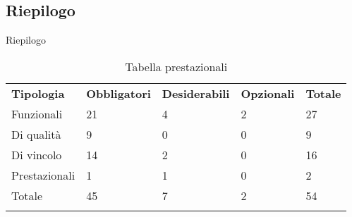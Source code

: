 
	
\subsection{Riepilogo}
Riepilogo
\begin{center}
	\renewcommand{\arraystretch}{1.5}
	\begin{longtable}{  p{1.8cm}  p{2cm} p{2.2cm}  p{1.8cm} p{1.2cm}}
		\rowcolor{tableHeadYellow}
		\textbf{Tipologia}   & \textbf{Obbligatori} & \textbf{Desiderabili} & \textbf{Opzionali} & \textbf{Totale}\\ 
		Funzionali    & 21          & 4            & 2         & 27     \\
		Di qualità    & 9           & 0            & 0         & 9      \\  
		Di vincolo    & 14          & 2            & 0         & 16     \\  
		Prestazionali & 1           & 1            & 0         & 2      \\  
		Totale        & 45          & 7            & 2         & 54     \\
		\rowcolor{white}
		\caption{Tabella \markg{requisiti} prestazionali}
	\end{longtable}
\end{center}
